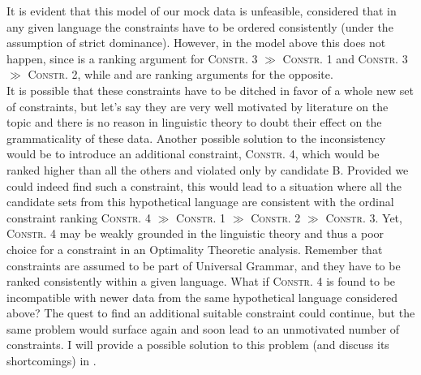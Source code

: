 It is evident that this model of our mock data is unfeasible, considered that in any given language the constraints have to be ordered consistently (under the assumption of strict dominance). However, in the model above this does not happen, since  is a ranking argument for \textsc{Constr. 3} $\gg$ \textsc{Constr. 1} and \textsc{Constr. 3} $\gg$ \textsc{Constr. 2}, while  and  are ranking arguments for the opposite.\\
It is possible that these constraints have to be ditched in favor of a whole new set of constraints, but let's say they are very well motivated by literature on the topic and there is no reason in linguistic theory to doubt their effect on the grammaticality of these data. Another possible solution to the inconsistency would be to introduce an additional constraint, \textsc{Constr. 4}, which would be ranked higher than all the others and violated only by candidate B. Provided we could indeed find such a constraint, this would lead to a situation where all the candidate sets from this hypothetical language are consistent with the ordinal constraint ranking \textsc{Constr. 4} $\gg$ \textsc{Constr. 1} $\gg$ \textsc{Constr. 2} $\gg$ \textsc{Constr. 3}. Yet, \textsc{Constr. 4} may be weakly grounded in the linguistic theory and thus a poor choice for a constraint in an Optimality Theoretic analysis. Remember that constraints are assumed to be part of Universal Grammar, and they have to be ranked consistently within a given language. What if \textsc{Constr. 4} is found to be incompatible with newer data from the same hypothetical language considered above? The quest to find an additional suitable constraint could continue, but the same problem would surface again and soon lead to an unmotivated number of constraints. I will provide a possible solution to this problem (and discuss its shortcomings) in . %
